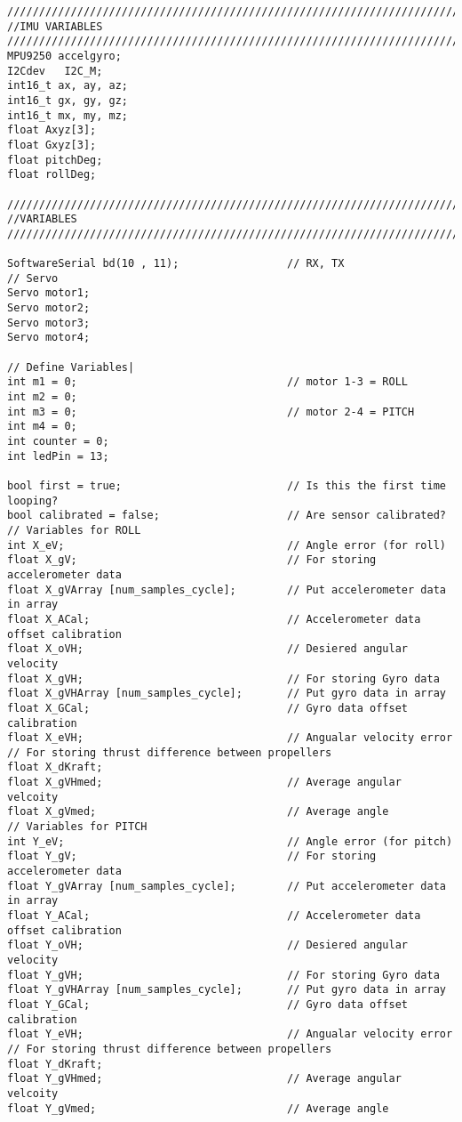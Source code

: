\begin{lstlisting}
//////////////////////////////////////////////////////////////////////////////
//IMU VARIABLES
//////////////////////////////////////////////////////////////////////////////
MPU9250 accelgyro;
I2Cdev   I2C_M;
int16_t ax, ay, az;
int16_t gx, gy, gz;
int16_t mx, my, mz;
float Axyz[3];
float Gxyz[3];
float pitchDeg;
float rollDeg;

//////////////////////////////////////////////////////////////////////////////
//VARIABLES
//////////////////////////////////////////////////////////////////////////////

SoftwareSerial bd(10 , 11);                 // RX, TX
// Servo
Servo motor1;
Servo motor2;
Servo motor3;
Servo motor4;
 
// Define Variables|
int m1 = 0;                                 // motor 1-3 = ROLL
int m2 = 0;
int m3 = 0;                                 // motor 2-4 = PITCH
int m4 = 0;
int counter = 0;
int ledPin = 13;
 
bool first = true;                          // Is this the first time looping?
bool calibrated = false;                    // Are sensor calibrated?
// Variables for ROLL
int X_eV;                                   // Angle error (for roll)
float X_gV;                                 // For storing accelerometer data
float X_gVArray [num_samples_cycle];        // Put accelerometer data in array
float X_ACal;                               // Accelerometer data offset calibration
float X_oVH;                                // Desiered angular velocity
float X_gVH;                                // For storing Gyro data
float X_gVHArray [num_samples_cycle];       // Put gyro data in array
float X_GCal;                               // Gyro data offset calibration
float X_eVH;                                // Angualar velocity error
// For storing thrust difference between propellers
float X_dKraft;                             
float X_gVHmed;                             // Average angular velcoity
float X_gVmed;                              // Average angle
// Variables for PITCH
int Y_eV;                                   // Angle error (for pitch)
float Y_gV;                                 // For storing accelerometer data
float Y_gVArray [num_samples_cycle];        // Put accelerometer data in array
float Y_ACal;                               // Accelerometer data offset calibration
float Y_oVH;                                // Desiered angular velocity
float Y_gVH;                                // For storing Gyro data
float Y_gVHArray [num_samples_cycle];       // Put gyro data in array
float Y_GCal;                               // Gyro data offset calibration
float Y_eVH;                                // Angualar velocity error
// For storing thrust difference between propellers
float Y_dKraft;                             
float Y_gVHmed;                             // Average angular velcoity
float Y_gVmed;                              // Average angle
 

\end{lstlisting}
